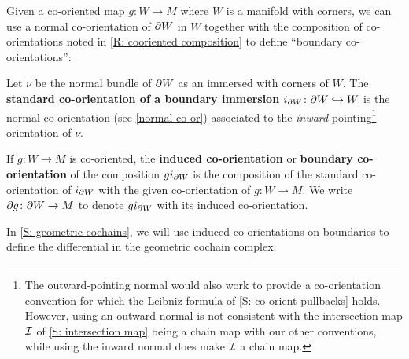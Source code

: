 Given a co-oriented map $g \colon W \to M$ where $W$ is a manifold with corners, we can use a normal co-orientation of $\partial W$ in $W$ together with the composition of co-orientations noted in \cref{R: cooriented composition} to define ``boundary co-orientations'':

\begin{definition}\label{D: boundary co-orientation}
	Let $\nu$ be the normal bundle of $\partial W$ as an immersed with corners of $W$.
	The \textbf{standard co-orientation of a boundary immersion} $i_{\partial W} \colon \partial W \hookrightarrow W$ is the normal co-orientation (see \cref{normal co-or}) associated to the \textit{inward}-pointing\footnote{The outward-pointing normal would also work to provide a co-orientation convention for which the Leibniz formula of \cref{S: co-orient pullbacks} holds.
	However, using an outward normal is not consistent with the intersection map $\mathcal{I}$ of \cref{S: intersection map} being a chain map with our other conventions, while using the inward normal does make $\mathcal{I}$ a chain map.} orientation of $\nu$.

	If $g \colon W \to M$ is co-oriented, the \textbf{induced co-orientation} or \textbf{boundary co-orientation} of the composition $gi_{\partial W}$ is the composition of the standard co-orientation of $i_{\partial W}$ with the given co-orientation of $g \colon W \to M$.
	We write $\partial g \colon \partial W \to M$ to denote $gi_{\partial W}$ with its induced co-orientation.
\end{definition}

In \cref{S: geometric cochains}, we will use induced co-orientations on boundaries to define the differential in the geometric cochain complex.



